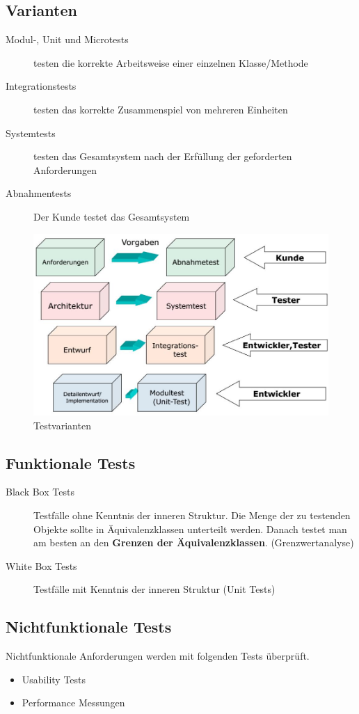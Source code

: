 \subsection{Varianten}
\begin{description}
	\item[Modul-, Unit und Microtests] testen die korrekte Arbeitsweise einer einzelnen Klasse/Methode
	\item[Integrationstests] testen das korrekte Zusammenspiel von mehreren Einheiten
	\item[Systemtests] testen das Gesamtsystem nach der Erfüllung der geforderten Anforderungen
	\item[Abnahmentests] Der Kunde testet das Gesamtsystem
\end{description}
\begin{figure}[h]
\centering
\includegraphics[width=0.7\linewidth]{images/test_varianten}
\caption{Testvarianten}
\label{fig:testvarianten}
\end{figure}


\clearpage

\subsection{Funktionale Tests}
\begin{description}
	\item[Black Box Tests] Testfälle ohne Kenntnis der inneren Struktur. Die Menge der zu testenden Objekte sollte in Äquivalenzklassen unterteilt werden. Danach testet man am besten an den \textbf{Grenzen der Äquivalenzklassen}. (Grenzwertanalyse)
	\item[White Box Tests] Testfälle mit Kenntnis der inneren Struktur (Unit Tests)
\end{description}

\subsection{Nichtfunktionale Tests}
Nichtfunktionale Anforderungen werden mit folgenden Tests überprüft.
\begin{itemize}
	\item Usability Tests
	\item Performance Messungen
\end{itemize}

